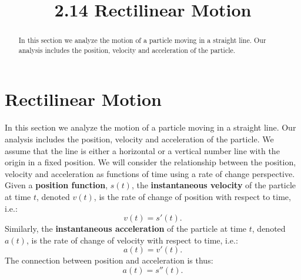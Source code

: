 \documentclass{ximera}
\title{2.14 Rectilinear Motion}
\begin{document}
\begin{abstract}
In this section we analyze the motion of a particle moving in a straight line. Our
analysis includes the position, velocity and acceleration of the particle.
\end{abstract}

\maketitle


\section{Rectilinear Motion}

In this section we analyze the motion of a particle moving in a straight line. Our
analysis includes the position, velocity and acceleration of the particle.
We assume that the line is either a horizontal or a vertical number line with the origin in a fixed position.
We will consider the relationship between the position, 
velocity and acceleration as functions of time using a rate of change perspective. \\
Given a \textbf{position function}, $s(t)$, the \textbf{instantaneous velocity} of the particle at time $t$, 
denoted $v(t)$, is the rate of change of position 
with respect to time, i.e.:
\[v(t) = s'(t).\]
Similarly, the \textbf{instantaneous acceleration} of the particle at time $t$, denoted $a(t)$, is the rate of change of 
velocity with respect to time, i.e.:
\[a(t) = v'(t).\]
The connection between position and acceleration is thus:
\[a(t) = s''(t).\]
\end{document}
